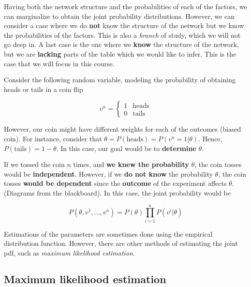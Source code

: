 Having both the network structure and the probabilities of each of the
factors, we can marginalize to obtain the joint probability
distributions. However, we can consider a case where we do \textbf{not}
know the structure of the network but we know the probabilities of the
factors. This is also a \emph{branch} of study, which we will not go
deep in. A last case is the one where we \textbf{know} the structure of
the network, but we are \textbf{lacking} parts of the table which we
would like to infer. This is the case that we will focus in this
course.

\begin{example}

  Consider the following random variable, modeling the probability of
  obtaining heads or tails in a coin flip

  \[
    v^n =\begin{cases}
      1 & \text{heads} \\
      0 & \text{tails}
    \end{cases}
  \]

  However, our coin might have different weights for each of the outcomes
  (biased coin). For instance, consider that
  \(\theta = P(\text{heads}) = P(v^n = 1| \theta)\). Hence,
  \(P(\text{tails}) = 1-\theta\). In this case, our goal would be to
  \textbf{determine} \(\theta\).

  If we tossed the coin \(n\) times, and \textbf{we knew the probability}
  \(\theta\), the coin tosses would be \textbf{independent}. However, if
  we \textbf{do not know} the probability \(\theta\), the coin tosses
  \textbf{would be dependent} since the \textbf{outcome} of the experiment
  affects \(\theta\). (Diagrams from the blackboard). In this case, the
  joint probability would be

  \[
    P(\theta,v^1,\dots,v^n) = P(\theta)\prod_{i=1}^n P(v^i|\theta)
  \]

\end{example}

Estimations of the parameters are sometimes done using the empirical
distribution function. However, there are other methods of estimating
the joint pdf, such as \emph{maximum likelihood estimation}.

\hypertarget{maximum-likelihood-estimation}{%
  \subsection{Maximum likelihood
    estimation}\label{maximum-likelihood-estimation}}

